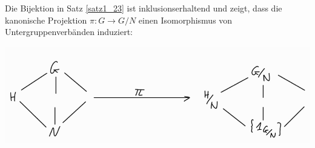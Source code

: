\begin{rem}\label{rem1_24}
	Die Bijektion in Satz \ref{satz1_23} ist inklusionserhaltend und zeigt, dass die kanonische Projektion $\pi \colon G \to G/N$ einen Isomorphismus von Untergruppenverbänden induziert:
	\begin{center}
		\includegraphics[scale=0.8]{images/2024-10-28_g3}
	\end{center}
\end{rem}